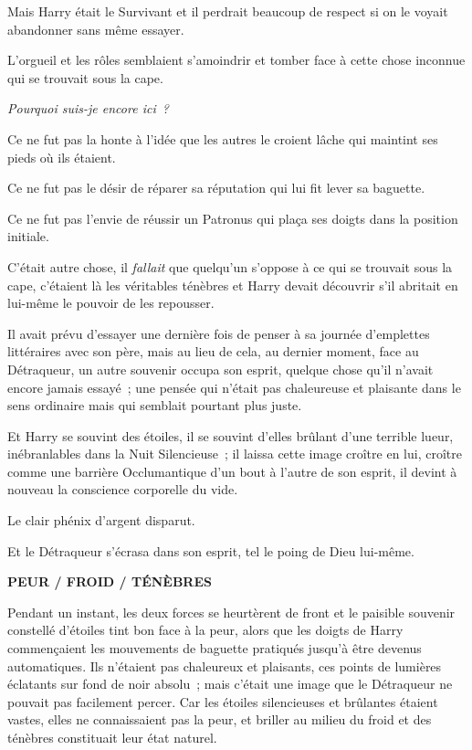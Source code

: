 Mais Harry était le Survivant et il perdrait beaucoup de respect si on le voyait abandonner sans même essayer.

L'orgueil et les rôles semblaient s'amoindrir et tomber face à cette chose inconnue qui se trouvait sous la cape.

\emph{Pourquoi suis-je encore ici~?}

Ce ne fut pas la honte à l'idée que les autres le croient lâche qui maintint ses pieds où ils étaient.

Ce ne fut pas le désir de réparer sa réputation qui lui fit lever sa baguette.

Ce ne fut pas l'envie de réussir un Patronus qui plaça ses doigts dans la position initiale.

C'était autre chose, il \emph{fallait} que quelqu'un s'oppose à ce qui se trouvait sous la cape, c'étaient là les véritables ténèbres et Harry devait découvrir s'il abritait en lui-même le pouvoir de les repousser.

Il avait prévu d'essayer une dernière fois de penser à sa journée d'emplettes littéraires avec son père, mais au lieu de cela, au dernier moment, face au Détraqueur, un autre souvenir occupa son esprit, quelque chose qu'il n'avait encore jamais essayé~; une pensée qui n'était pas chaleureuse et plaisante dans le sens ordinaire mais qui semblait pourtant plus juste.

Et Harry se souvint des étoiles, il se souvint d'elles brûlant d'une terrible lueur, inébranlables dans la Nuit Silencieuse~; il laissa cette image croître en lui, croître comme une barrière Occlumantique d'un bout à l'autre de son esprit, il devint à nouveau la conscience corporelle du vide.

Le clair phénix d'argent disparut.

Et le Détraqueur s'écrasa dans son esprit, tel le poing de Dieu lui-même.

\textbf{PEUR / FROID / TÉNÈBRES}

Pendant un instant, les deux forces se heurtèrent de front et le paisible souvenir constellé d'étoiles tint bon face à la peur, alors que les doigts de Harry commençaient les mouvements de baguette pratiqués jusqu'à être devenus automatiques.
Ils n'étaient pas chaleureux et plaisants, ces points de lumières éclatants sur fond de noir absolu~; mais c'était une image que le Détraqueur ne pouvait pas facilement percer.
Car les étoiles silencieuses et brûlantes étaient vastes, elles ne connaissaient pas la peur, et briller au milieu du froid et des ténèbres constituait leur état naturel.

